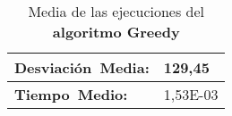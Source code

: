 \begin{table}[!ht]%
    \centering
    \begin{tabular}{|l|l|}
        \hline
        \textbf{Desviación~Media:} & 129,45 \\ \hline
        \textbf{Tiempo~Medio:} & 1,53E-03 \\ \hline
    \end{tabular}
\caption{Media de las ejecuciones del \textbf{algoritmo Greedy}}
\end{table}